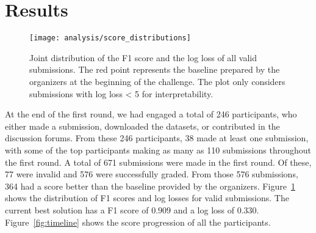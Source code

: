 \documentclass[sigconf]{acmart}
\begin{document}
\section{Results}


\begin{figure}[t]
\centering
\texttt{[image: analysis/score\_distributions]}
\caption{Joint distribution of the F1 score and the log loss of all valid submissions. The red point represents the baseline prepared by the organizers at the beginning of the challenge. The plot only considers submissions with log loss < 5 for interpretability.}
\label{fig:jointplot}
\end{figure}


At the end of the first round, we had engaged a total of 246 participants, who either made a submission, downloaded the datasets, or contributed in the discussion forums. From these 246 participants, 38 made at least one submission, with some of the top participants making as many as 110 submissions throughout the first round.
A total of 671 submissions were made in the first round. Of these, 77 were invalid and 576 were successfully graded.
From those 576 submissions, 364 had a score better than the baseline provided by the organizers. Figure~\ref{fig:jointplot} shows the distribution of F1 scores and log losses for valid submissions.
The current best solution has a F1 score of $0.909$ and a log loss of $0.330$. %
Figure~\ref{fig:timeline} shows the score progression of all the participants.
\end{document}
